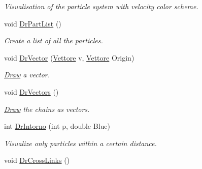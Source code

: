 \begin{DoxyCompactItemize}
\begin{DoxyCompactList}\small\item\em \-Visualisation of the particle system with velocity color scheme. \end{DoxyCompactList}\item 
\hypertarget{classElPoly_ae89cedb0e996d10ec5f96e14f1f867cf}{void \hyperlink{classElPoly_ae89cedb0e996d10ec5f96e14f1f867cf}{\-Dr\-Part\-List} ()}\label{classElPoly_ae89cedb0e996d10ec5f96e14f1f867cf}

\begin{DoxyCompactList}\small\item\em \-Create a list of all the particles. \end{DoxyCompactList}\item 
\hypertarget{classElPoly_a3eef417e007c18f604455cfb38a948cb}{void \hyperlink{classElPoly_a3eef417e007c18f604455cfb38a948cb}{\-Dr\-Vector} (\hyperlink{classVettore}{\-Vettore} v, \hyperlink{classVettore}{\-Vettore} \-Origin)}\label{classElPoly_a3eef417e007c18f604455cfb38a948cb}

\begin{DoxyCompactList}\small\item\em \hyperlink{classDraw}{\-Draw} a vector. \end{DoxyCompactList}\item 
\hypertarget{classElPoly_a9968be2f08ada4e898c92c7e8552ac63}{void \hyperlink{classElPoly_a9968be2f08ada4e898c92c7e8552ac63}{\-Dr\-Vectors} ()}\label{classElPoly_a9968be2f08ada4e898c92c7e8552ac63}

\begin{DoxyCompactList}\small\item\em \hyperlink{classDraw}{\-Draw} the chains as vectors. \end{DoxyCompactList}\item 
\hypertarget{classElPoly_a21b11a8a49dc2686cd23c41f24a3ec86}{int \hyperlink{classElPoly_a21b11a8a49dc2686cd23c41f24a3ec86}{\-Dr\-Intorno} (int p, double \-Blue)}\label{classElPoly_a21b11a8a49dc2686cd23c41f24a3ec86}

\begin{DoxyCompactList}\small\item\em \-Visualize only particles within a certain distance. \end{DoxyCompactList}\item 
\hypertarget{classElPoly_ad36be1f2ea9bef2742992bfb62023fb8}{void \hyperlink{classElPoly_ad36be1f2ea9bef2742992bfb62023fb8}{\-Dr\-Cross\-Links} ()}\label{classElPoly_ad36be1f2ea9bef2742992bfb62023fb8}


\end{DoxyCompactItemize}
